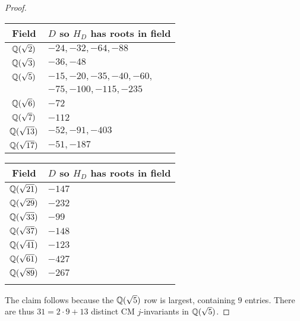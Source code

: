 \documentclass{amsart}
\begin{document}
\begin{proof}
\begin{center}
\begin{tabular}{|c|l|}\hline
Field & $D$ so $H_D$ has roots in field\\\hline
$\mathbb{Q}(\sqrt{2})$ & $-24,-32,-64,-88$ \\\hline
$\mathbb{Q}(\sqrt{3})$ & $-36,-48$ \\\hline
$\mathbb{Q}(\sqrt{5})$ & $-15,-20,-35,-40,-60,$ \\
             & $-75,-100,-115,-235$\\\hline
$\mathbb{Q}(\sqrt{6})$ & $-72$ \\\hline
$\mathbb{Q}(\sqrt{7})$ & $-112$ \\\hline
$\mathbb{Q}(\sqrt{13})$ & $-52,-91,-403$ \\\hline
$\mathbb{Q}(\sqrt{17})$ & $-51,-187$ \\\hline
\end{tabular}
\begin{tabular}{|c|l|}\hline
Field & $D$ so $H_D$ has roots in field\\\hline
$\mathbb{Q}(\sqrt{21})$ & $-147$ \\\hline
$\mathbb{Q}(\sqrt{29})$ & $-232$ \\\hline
$\mathbb{Q}(\sqrt{33})$ & $-99$ \\\hline
$\mathbb{Q}(\sqrt{37})$ & $-148$ \\\hline
$\mathbb{Q}(\sqrt{41})$ & $-123$ \\\hline
$\mathbb{Q}(\sqrt{61})$ & $-427$ \\\hline
$\mathbb{Q}(\sqrt{89})$ & $-267$ \\\hline
& \\\hline
\end{tabular}
\end{center}
The claim follows because the $\mathbb{Q}(\sqrt{5})$ row is largest,
containing $9$ entries.  There are thus $31 = 2\cdot 9 + 13$ distinct CM $j$-invariants
in $\mathbb{Q}(\sqrt{5})$.

\end{proof}




 

\end{document}
